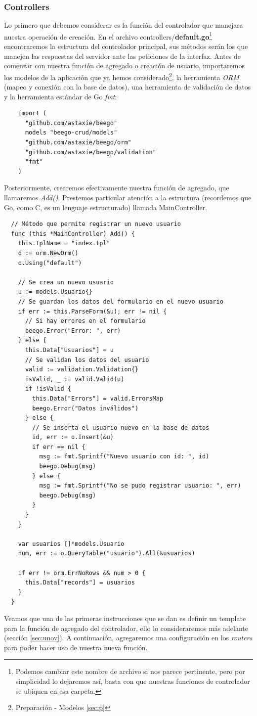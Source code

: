 \documentclass[12pt]{article}
\begin{document}
\subsubsection{Controllers}
Lo primero que debemos considerar es la función del controlador que manejara
nuestra operación de creación. En el archivo controllers/\textbf{default.go}\footnote{Podemos cambiar este nombre de archivo si nos parece pertinente, pero por simplicidad lo dejaremos así, basta con que nuestras funciones de controlador se ubiquen en esa carpeta.}
encontraremos la estructura del controlador principal, sus métodos serán los que
manejen las respuestas del servidor ante las peticiones de la interfaz.
Antes de comenzar con nuestra función de agregado o creación de usuario, importaremos
los modelos de la aplicación que ya hemos considerado\footnote{Preparación - Modelos \ref{sec:p}},
la herramienta \textit{ORM} (mapeo y conexión con la base de datos), una herramienta de validación
de datos y la herramienta estándar de Go \textit{fmt}:
\begin{verbatim}
    import (
      "github.com/astaxie/beego"
      models "beego-crud/models"
      "github.com/astaxie/beego/orm"
      "github.com/astaxie/beego/validation"
      "fmt"
    )
\end{verbatim}
Posteriormente, crearemos efectivamente nuestra función de agregado, que
llamaremos \textit{Add()}. Prestemos particular atención a la estructura (recordemos
que Go, como C, es un lenguaje estructurado) llamada MainController.
\begin{verbatim}
  // Método que permite registrar un nuevo usuario
  func (this *MainController) Add() {
    this.TplName = "index.tpl"
    o := orm.NewOrm()
    o.Using("default")

    // Se crea un nuevo usuario
    u := models.Usuario{}
    // Se guardan los datos del formulario en el nuevo usuario
    if err := this.ParseForm(&u); err != nil {
      // Si hay errores en el formulario
      beego.Error("Error: ", err)
    } else {
      this.Data["Usuarios"] = u
      // Se validan los datos del usuario
      valid := validation.Validation{}
      isValid, _ := valid.Valid(u)
      if !isValid {
        this.Data["Errors"] = valid.ErrorsMap
        beego.Error("Datos inválidos")
      } else {
        // Se inserta el usuario nuevo en la base de datos
        id, err := o.Insert(&u)
        if err == nil {
          msg := fmt.Sprintf("Nuevo usuario con id: ", id)
          beego.Debug(msg)
        } else {
          msg := fmt.Sprintf("No se pudo registrar usuario: ", err)
          beego.Debug(msg)
        }
      }
    }

    var usuarios []*models.Usuario
    num, err := o.QueryTable("usuario").All(&usuarios)

    if err != orm.ErrNoRows && num > 0 {
      this.Data["records"] = usuarios
    }
  }
\end{verbatim}
Veamos que una de las primeras instrucciones que se dan es definir un template
para la función de agregado del controlador, ello lo consideraremos más adelante (sección \ref{sec:unov}).
A continuación, agregaremos una configuración en los \textit{routers} para poder
hacer uso de nuestra nueva función.
\end{document}
